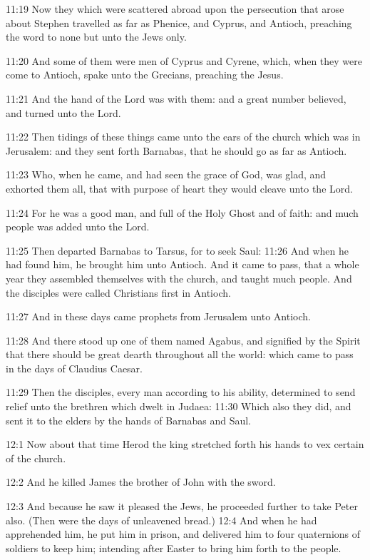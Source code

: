 11:19 Now they which were scattered abroad upon the persecution that
arose about Stephen travelled as far as Phenice, and Cyprus, and
Antioch, preaching the word to none but unto the Jews only.

11:20 And some of them were men of Cyprus and Cyrene, which, when they
were come to Antioch, spake unto the Grecians, preaching the \LORD
Jesus.

11:21 And the hand of the Lord was with them: and a great number
believed, and turned unto the Lord.

11:22 Then tidings of these things came unto the ears of the church
which was in Jerusalem: and they sent forth Barnabas, that he should
go as far as Antioch.

11:23 Who, when he came, and had seen the grace of God, was glad, and
exhorted them all, that with purpose of heart they would cleave unto
the Lord.

11:24 For he was a good man, and full of the Holy Ghost and of faith:
and much people was added unto the Lord.

11:25 Then departed Barnabas to Tarsus, for to seek Saul: 11:26 And
when he had found him, he brought him unto Antioch. And it came to
pass, that a whole year they assembled themselves with the church, and
taught much people. And the disciples were called Christians first in
Antioch.

11:27 And in these days came prophets from Jerusalem unto Antioch.

11:28 And there stood up one of them named Agabus, and signified by
the Spirit that there should be great dearth throughout all the world:
which came to pass in the days of Claudius Caesar.

11:29 Then the disciples, every man according to his ability,
determined to send relief unto the brethren which dwelt in Judaea:
11:30 Which also they did, and sent it to the elders by the hands of
Barnabas and Saul.

12:1 Now about that time Herod the king stretched forth his hands to
vex certain of the church.

12:2 And he killed James the brother of John with the sword.

12:3 And because he saw it pleased the Jews, he proceeded further to
take Peter also. (Then were the days of unleavened bread.)  12:4 And
when he had apprehended him, he put him in prison, and delivered him
to four quaternions of soldiers to keep him; intending after Easter to
bring him forth to the people.

